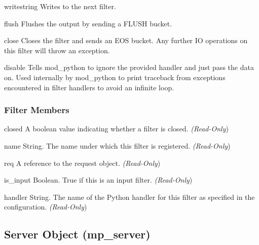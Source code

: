 \begin{methoddesc}[filter]{write}{string}
Writes  to the next filter.
\end{methoddesc}

\begin{methoddesc}[filter]{flush}{}
Flushes the output by sending a FLUSH bucket.
\end{methoddesc}

\begin{methoddesc}[filter]{close}{}
Closes the filter and sends an EOS bucket. Any further IO operations on
this filter will throw an exception.
\end{methoddesc}

\begin{methoddesc}[filter]{disable}{}
Tells mod_python to ignore the provided handler and just pass the data
on. Used internally by mod_python to print traceback from exceptions
encountered in filter handlers to avoid an infinite loop.
\end{methoddesc}

\subsubsection{Filter Members\label{pyapi-mpfilt-mem}}

\begin{memberdesc}[filter]{closed}
A boolean value indicating whether a filter is closed.
\emph{(Read-Only})
\end{memberdesc}

\begin{memberdesc}[filter]{name}
String. The name under which this filter is registered.
\emph{(Read-Only})
\end{memberdesc}

\begin{memberdesc}[filter]{req}
A reference to the request object.
\emph{(Read-Only})
\end{memberdesc}

\begin{memberdesc}[filter]{is_input}
Boolean. True if this is an input filter.
\emph{(Read-Only})
\end{memberdesc}

\begin{memberdesc}[filter]{handler}
String. The name of the Python handler for this filter as specified in
the configuration. 
\emph{(Read-Only})
\end{memberdesc}

\subsection{Server Object (mp_server)\label{pyapi-mpserver}}

